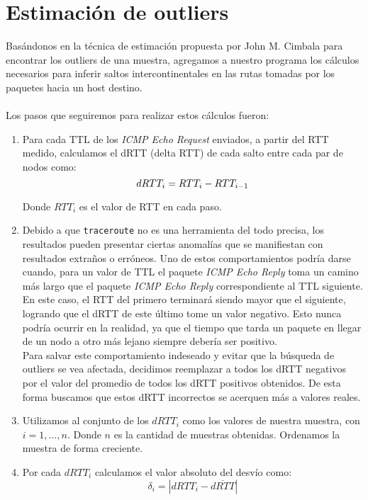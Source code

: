 \section{Estimación de outliers}

Basándonos en la técnica de estimación propuesta por John M. Cimbala para encontrar los outliers de una muestra, agregamos a nuestro programa los cálculos necesarios para inferir saltos intercontinentales en las rutas tomadas por los paquetes hacia un host destino.
\\\\
Los pasos que seguiremos para realizar estos cálculos fueron:

\begin{enumerate}
\item 
Para cada TTL de los \emph{ICMP Echo Request} enviados, a partir del RTT medido, calculamos el dRTT (delta RTT) de cada salto entre cada par de nodos como:
\[
\\dRTT_i =RTT_i - RTT_{i-1}
\]

Donde $RTT_i$ es el valor de RTT en cada paso. 

\item
Debido a que \texttt{traceroute} no es una herramienta del todo precisa, los resultados pueden presentar ciertas anomalías que se manifiestan con resultados extraños o erróneos. Uno de estos comportamientos podría darse cuando, para un valor de TTL el paquete \emph{ICMP Echo Reply} toma un camino más largo que el paquete \emph{ICMP Echo Reply} correspondiente al TTL siguiente. En este caso, el RTT del primero terminará siendo mayor que el siguiente, logrando que el dRTT de este último tome un valor negativo. Esto nunca podría ocurrir en la realidad, ya que el tiempo que tarda un paquete en llegar de un nodo a otro más lejano siempre debería ser positivo.
\\
Para salvar este comportamiento indeseado y evitar que la búsqueda de outliers se vea afectada, decidimos reemplazar a todos los dRTT negativos por el valor del promedio de todos los dRTT positivos obtenidos. De esta forma buscamos que estos dRTT incorrectos se acerquen más a valores reales. 

\item
Utilizamos al conjunto de los $dRTT_i$ como los valores de nuestra muestra, con $i=1,…,n$. Donde $n$ es la cantidad de muestras obtenidas.
Ordenamos la muestra de forma creciente.

\item
Por cada $dRTT_i$ calculamos el valor absoluto del desvío como:
\[
\delta_i = |dRTT_i - \overline{dRTT}|
\]


\end{enumerate}
